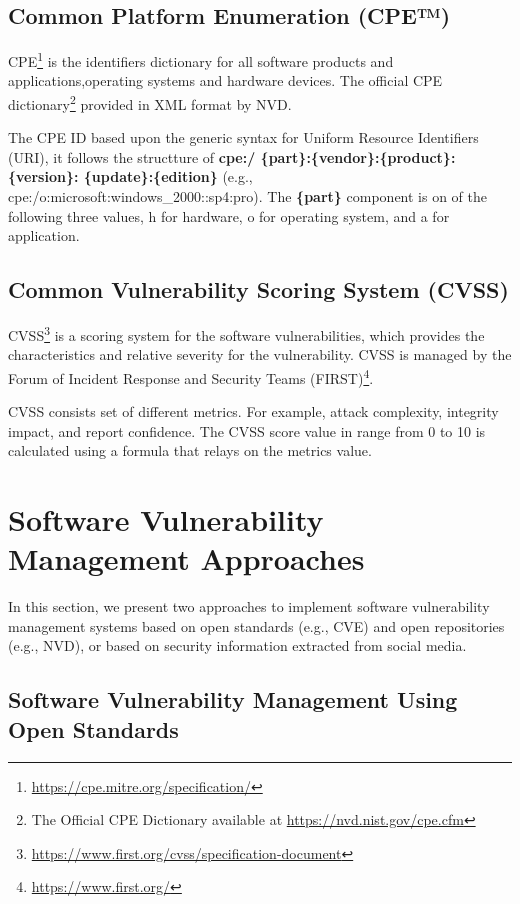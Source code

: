 \documentclass{llncs}
\begin{document}
 \subsection{Common Platform Enumeration (CPE™)}
 CPE\footnote{\url{https://cpe.mitre.org/specification/}} is the identifiers dictionary for all software products and applications,operating systems and hardware devices. The official CPE dictionary\footnote{The Official CPE Dictionary available at \url{https://nvd.nist.gov/cpe.cfm}} provided in XML format by NVD.
 \par The CPE ID based upon the generic syntax for Uniform Resource Identifiers (URI), it follows the structture of \textbf{cpe:/ \{part\}:\{vendor\}:\{product\}:\{version\}:
 \{update\}:\{edition\}} (e.g., cpe:/o:microsoft:windows\_2000::sp4:pro). The \textbf{\{part\}} component is on of the following three values, h for hardware, o for operating system, and a for application. 
  
  
 \subsection{Common Vulnerability Scoring System (CVSS)}
 
 \par CVSS\footnote{\url{https://www.first.org/cvss/specification-document}} is a scoring system for the software  vulnerabilities, which provides the characteristics and relative severity for the vulnerability. CVSS is managed by the Forum of Incident Response and Security Teams (FIRST)\footnote{\url{https://www.first.org/}}.
 
 \par CVSS consists set of different metrics. For example, attack complexity, integrity impact, and report confidence. The CVSS score value in range from 0 to 10  is calculated using a formula that relays on the metrics value.

\section{Software	Vulnerability	Management	Approaches}
 
 In this section, we present two approaches to implement software vulnerability management systems based on  open standards (e.g., CVE) and open repositories (e.g., NVD), or based on  security information extracted from social media.
\subsection{Software	Vulnerability	Management	Using	Open	Standards}
\end{document}
